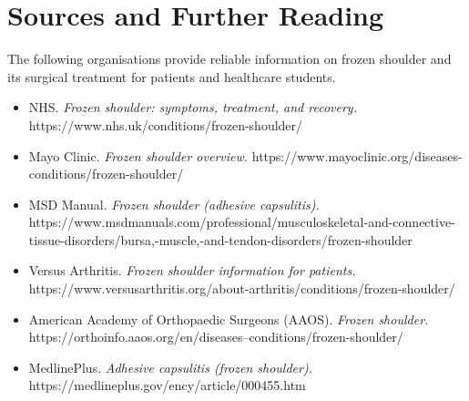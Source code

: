 \section*{Sources and Further Reading}
The following organisations provide reliable information on frozen shoulder and its surgical treatment for patients and healthcare students.

\begin{itemize}
    \item NHS. \textit{Frozen shoulder: symptoms, treatment, and recovery.} https://www.nhs.uk/conditions/frozen-shoulder/
    \item Mayo Clinic. \textit{Frozen shoulder overview.} https://www.mayoclinic.org/diseases-conditions/frozen-shoulder/
    \item MSD Manual. \textit{Frozen shoulder (adhesive capsulitis).} https://www.msdmanuals.com/professional/musculoskeletal-and-connective-tissue-disorders/bursa,-muscle,-and-tendon-disorders/frozen-shoulder
    \item Versus Arthritis. \textit{Frozen shoulder information for patients.} https://www.versusarthritis.org/about-arthritis/conditions/frozen-shoulder/
    \item American Academy of Orthopaedic Surgeons (AAOS). \textit{Frozen shoulder.} https://orthoinfo.aaos.org/en/diseases--conditions/frozen-shoulder/
    \item MedlinePlus. \textit{Adhesive capsulitis (frozen shoulder).} https://medlineplus.gov/ency/article/000455.htm
\end{itemize}
